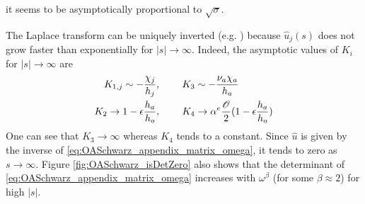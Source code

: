 it seems to be asymptotically proportional to $\sqrt{\sigma}$.
\par
The Laplace transform can be uniquely inverted
(e.g. \citep{cohen_inversion_2007}) because
$\widehat{u}_j(s)$ does not grow faster than exponentially
for $|s|\rightarrow \infty$.
Indeed, the asymptotic values of $K_i$ for $|s|\to\infty$ are
\begin{equation*}
	\begin{aligned}
		K_{1,j} \sim -\frac{\chi_j}{h_j}, ~~~~~~~&
		K_{3} \sim -\frac{\nu_a \chi_a}{h_a}\\
		K_{2} \rightarrow 1 - \epsilon \frac{h_a}{h_o},
		~~~~~~~&
		K_{4} \rightarrow \alpha^e
		\frac{\cal O}{2}(1 - \epsilon \frac{h_a}{h_o})
	\end{aligned}
\end{equation*}
One can see that $K_3 \rightarrow \infty$ whereas $K_4$ tends to
a constant. Since $\widehat{u}$ is given by the inverse of
\eqref{eq:OASchwarz_appendix_matrix_omega}, it tends to zero as
$s\rightarrow \infty$.
Figure \ref{fig:OASchwarz_isDetZero} also
shows that the determinant of
\eqref{eq:OASchwarz_appendix_matrix_omega}
increases with $\omega^\beta$ (for some $\beta\approx 2$) for
high $|s|$.
